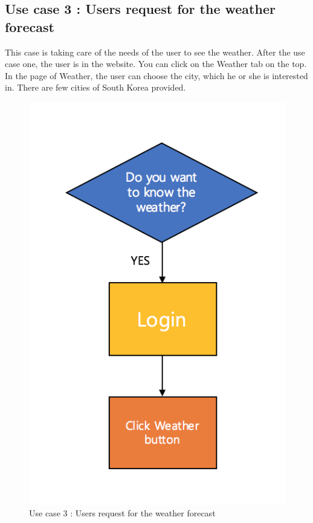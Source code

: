 \documentclass[conference]{IEEEtran}
\begin{document}
\subsection{Use case 3 : Users request for the weather forecast} This case is taking care of the needs of the user to see the weather. After the use case one, the user is in the website. You can click on the Weather tab on the top. In the page of Weather, the user can choose the city, which he or she is interested in. There are few cities of South Korea provided.
\begin{figure}[H]
\begin{center}
    \includegraphics[scale=0.9]{usecase3}
    \caption{Use case 3 : Users request for the weather forecast} \label{fig:label}
\end{center}
\end{figure}
\end{document}
